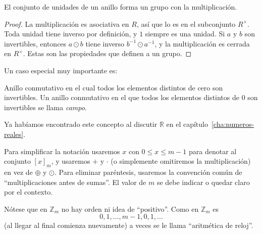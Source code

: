   \begin{theorem}
    El conjunto de unidades de un anillo forma un grupo con la multiplicación.
  \end{theorem}
  \begin{proof}
    La multiplicación es asociativa en \(R\),
    así que lo es en el subconjunto \(R^\times\).
    Toda unidad tiene inverso por definición,
    y \(1\) siempre es una unidad.
    Si \(a\) y \(b\) son invertibles,
    entonces \(a \odot b\) tiene inverso \(b^{-1} \odot a^{-1}\),
    y la multiplicación es cerrada en \(R^\times\).
    Estas son las propiedades que definen a un grupo.
  \end{proof}

  Un caso especial muy importante es:
  \begin{definition}
    \label{def:field}
	     {Anillo conmutativo en el cual
	      todos los elementos distintos de cero
	      son invertibles.}
    Un anillo conmutativo en el que todos los elementos distintos de \(0\)
    son invertibles se llama \emph{campo}.
  \end{definition}
  \noindent
  Ya habíamos encontrado este concepto al discutir \(\mathbb{R}\)
  en el capítulo~\ref{cha:numeros-reales}.

  Para simplificar la notación usaremos \(x\) con \(0 \le x \le m - 1\)
  para denotar al conjunto \([x]_m\),
  y usaremos \(+\) y \(\cdot\)
  (o simplemente omitiremos la multiplicación)
  en vez de \(\oplus\) y \(\odot\).
  Para eliminar paréntesis,
  usaremos la convención común de ``multiplicaciones antes de sumas''.
  El valor de \(m\) se debe indicar o quedar claro por el contexto.

  Nótese que en \(\mathbb{Z}_m\)
  no hay orden ni idea de ``positivo''.
  Como en \(\mathbb{Z}_m\) es
  \begin{equation*}
    0, 1, \dotsc, m - 1, 0, 1, \dotsc
  \end{equation*}
  (al llegar al final comienza nuevamente)
  a veces se le llama ``aritmética de reloj''.%

